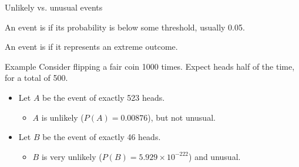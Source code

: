 \documentclass[xcolor=table, aspectratio=169, bigger]{beamer}
\begin{document}
\begin{frame}{Unlikely vs. unusual events}
\begin{block}{}
An event is  if its probability is below some threshold, usually 0.05.
\end{block}

\begin{block}{}
An event is  if it represents an extreme outcome.
\end{block}

\pause

\begin{exampleblock}{Example}
Consider flipping a fair coin 1000 times. Expect heads half of the time, for a total of 500.

\begin{itemize}
\pause
\item Let $A$ be the event of exactly 523 heads.
\begin{itemize}
\pause
\item $A$ is unlikely ($P(A) = 0.00876$), but not unusual.
\end{itemize}

\pause
\item  Let $B$ be the event of exactly 46 heads.
\begin{itemize}
\pause
\item $B$ is very unlikely ($P(B) = 5.929 \times 10^{-222}$) and unusual.
\end{itemize}
\end{itemize}
\end{exampleblock}
\end{frame}
\end{document}
